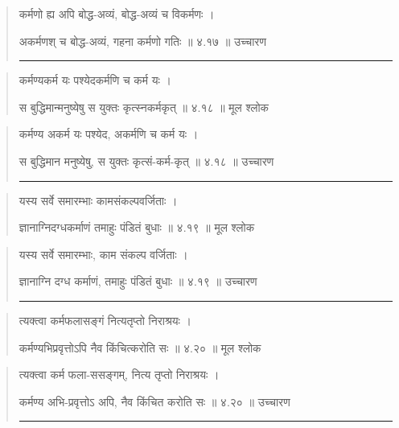 \begin{quotation}

कर्मणो ह्य अपि बोद्ध-अव्यं, बोद्ध-अव्यं च विकर्मणः  ।  

अकर्मणश् च बोद्ध-अव्यं, गहना कर्मणो गतिः  ॥ ४.१७ ॥  उच्चारण

\noindent\rule{16cm}{0.4pt} 
\end{quotation}


\begin{quotation}

कर्मण्यकर्म यः पश्येदकर्मणि च कर्म यः  ।  

स बुद्धिमान्मनुष्येषु स युक्तः कृत्स्नकर्मकृत्‌  ॥ ४.१८ ॥  मूल श्लोक
\end{quotation}

\begin{quotation}

कर्मण्य अकर्म यः पश्येद, अकर्मणि च कर्म यः  ।  

स बुद्धिमान मनुष्येषु, स युक्तः कृत्सं-कर्म-कृत्‌  ॥ ४.१८ ॥  उच्चारण

\noindent\rule{16cm}{0.4pt} 
\end{quotation}


\begin{quotation}

यस्य सर्वे समारम्भाः कामसंकल्पवर्जिताः  ।  

ज्ञानाग्निदग्धकर्माणं तमाहुः पंडितं बुधाः  ॥ ४.१९ ॥  मूल श्लोक
\end{quotation}

\begin{quotation}

यस्य सर्वे समारम्भाः, काम संकल्प वर्जिताः  ।  

ज्ञानाग्नि दग्ध कर्माणं, तमाहुः पंडितं बुधाः  ॥ ४.१९ ॥  उच्चारण

\noindent\rule{16cm}{0.4pt} 
\end{quotation}


\begin{quotation}

त्यक्त्वा कर्मफलासङ्गं नित्यतृप्तो निराश्रयः  ।  

कर्मण्यभिप्रवृत्तोऽपि नैव किंचित्करोति सः  ॥ ४.२० ॥  मूल श्लोक
\end{quotation}

\begin{quotation}

त्यक्त्वा कर्म फला-ससङ्गम्, नित्य तृप्तो निराश्रयः  ।  

कर्मण्य अभि-प्रवृत्तोऽ अपि, नैव किंचित करोति सः  ॥ ४.२० ॥  उच्चारण

\noindent\rule{16cm}{0.4pt} 
\end{quotation}


